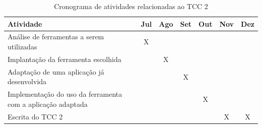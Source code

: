 \begin{table}[!h]
\centering
\caption{Cronograma de atividades relacionadas ao TCC 2}
\label{cronograma_tcc2}
\begin{tabular}{|p{9cm}|c|c|c|c|c|c|}
\hline
Atividade                                                   & \multicolumn{1}{l|}{Jul} & \multicolumn{1}{l|}{Ago} & \multicolumn{1}{l|}{Set} & \multicolumn{1}{l|}{Out} & \multicolumn{1}{l|}{Nov} & \multicolumn{1}{l|}{Dez} \\ \hline
Análise de ferramentas a serem utilizadas                   & X                           &                             &                              &                            &                             &                              \\ \hline
Implantação da ferramenta escolhida                         &                             & X                            &                              &                            &                             &                              \\ \hline
Adaptação de uma aplicação já desenvolvida                  &                             &                               & X                            &                            &                             &                              \\ \hline
Implementação do uso da ferramenta com a aplicação adaptada &                             &                         &                              & X                          &                             &                              \\ \hline
Escrita do TCC 2                                            &                             &                             &                              &                            & X                           & X          \\ \hline
\end{tabular}
\end{table}